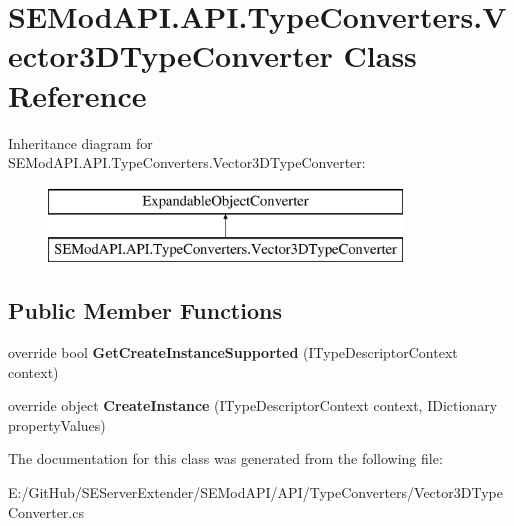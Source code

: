 \hypertarget{class_s_e_mod_a_p_i_1_1_a_p_i_1_1_type_converters_1_1_vector3_d_type_converter}{}\section{S\+E\+Mod\+A\+P\+I.\+A\+P\+I.\+Type\+Converters.\+Vector3\+D\+Type\+Converter Class Reference}
\label{class_s_e_mod_a_p_i_1_1_a_p_i_1_1_type_converters_1_1_vector3_d_type_converter}
Inheritance diagram for S\+E\+Mod\+A\+P\+I.\+A\+P\+I.\+Type\+Converters.\+Vector3\+D\+Type\+Converter\+:\begin{figure}[H]
\begin{center}
\leavevmode
\includegraphics[height=2.000000cm]{class_s_e_mod_a_p_i_1_1_a_p_i_1_1_type_converters_1_1_vector3_d_type_converter}
\end{center}
\end{figure}
\subsection*{Public Member Functions}
\begin{DoxyCompactItemize}
\item 
\hypertarget{class_s_e_mod_a_p_i_1_1_a_p_i_1_1_type_converters_1_1_vector3_d_type_converter_a86260292628aff667f2e892d0b961906}{}override bool {\bfseries Get\+Create\+Instance\+Supported} (I\+Type\+Descriptor\+Context context)\label{class_s_e_mod_a_p_i_1_1_a_p_i_1_1_type_converters_1_1_vector3_d_type_converter_a86260292628aff667f2e892d0b961906}

\item 
\hypertarget{class_s_e_mod_a_p_i_1_1_a_p_i_1_1_type_converters_1_1_vector3_d_type_converter_a6f0eade3592c0844a04d6f5adb3deb63}{}override object {\bfseries Create\+Instance} (I\+Type\+Descriptor\+Context context, I\+Dictionary property\+Values)\label{class_s_e_mod_a_p_i_1_1_a_p_i_1_1_type_converters_1_1_vector3_d_type_converter_a6f0eade3592c0844a04d6f5adb3deb63}

\end{DoxyCompactItemize}


The documentation for this class was generated from the following file\+:\begin{DoxyCompactItemize}
\item 
E\+:/\+Git\+Hub/\+S\+E\+Server\+Extender/\+S\+E\+Mod\+A\+P\+I/\+A\+P\+I/\+Type\+Converters/Vector3\+D\+Type\+Converter.\+cs\end{DoxyCompactItemize}
